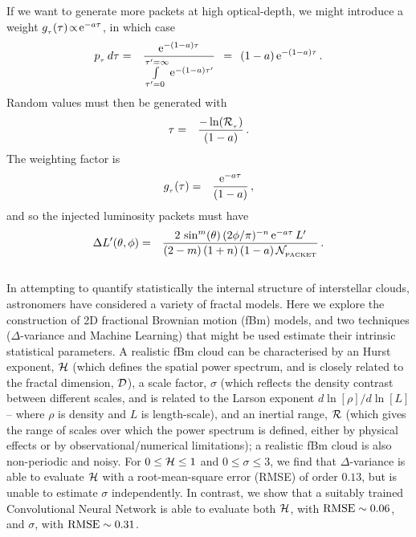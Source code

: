 \documentclass[usenatbib]{mn2e}
\numberwithin{equation}{section}
\begin{document}
If we want to generate more packets at high optical-depth, we might introduce a weight $g_{_\tau}(\tau)\!\propto\!{\rm e}^{-a\tau}$, in which case
\begin{eqnarray}
p_{_\tau}\,d\tau&=&\frac{{\rm e}^{-(1-a)\tau}}{\int\limits_{\tau'=0}^{\tau'=\infty}{\rm e}^{-(1-a)\tau'}}\;\,=\;\,(1-a)\,{\rm e}^{-(1-a)\tau}\,.
\end{eqnarray}
Random values must then be generated with
\begin{eqnarray}
\tau&=&\frac{-\ln({\cal R}_{_\tau})}{(1-a)}\,.
\end{eqnarray}
The weighting factor is
\begin{eqnarray}
g_{_\tau}(\tau)&=&\frac{{\rm e}^{-a\tau}}{(1-a)}\,,
\end{eqnarray}
and so the injected luminosity packets must have
\begin{eqnarray}
\Delta L'(\theta,\phi)&=&\frac{2\,\sin^m(\theta)\,(2\phi /\pi)^{-n}\,{\rm e}^{-a\tau}\,L'}{(2-m)\,(1+n)\,(1-a)\,{\cal N}_{_{\rm PACKET}}}\,.
\end{eqnarray}





\newpage$\;$\newpage

In attempting to quantify statistically the internal structure of interstellar clouds, astronomers have considered a variety of fractal models. Here we explore the construction of 2D fractional Brownian motion (fBm) models, and two techniques ($\Delta$-variance and Machine Learning) that might be used estimate their intrinsic statistical parameters. A realistic fBm cloud can be characterised by an Hurst exponent, ${\cal H}$ (which defines the spatial power spectrum, and is closely related to the fractal dimension, ${\cal D}$), a scale factor, $\sigma$ (which reflects the density contrast between different scales, and is related to the Larson exponent $d\ln[\rho]/d\ln[L]$ -- where $\rho$ is density and $L$ is length-scale), and an inertial range, ${\cal R}$ (which gives the range of scales over which the power spectrum is defined, either by physical effects or by observational/numerical limitations); a realistic fBm cloud is also non-periodic and noisy. For $0\leq{\cal H}\leq 1$ and $0\leq\sigma\leq 3$, we find that $\Delta$-variance is able to evaluate ${\cal H}$ with a root-mean-square error (RMSE) of order $0.13$, but is unable to estimate $\sigma$ independently. In contrast, we show that a suitably trained Convolutional Neural Network is able to evaluate both ${\cal H}$, with ${\rm RMSE}\sim0.06$, and $\sigma$, with ${\rm RMSE}\sim 0.31$.





\label{lastpage}
\end{document}
